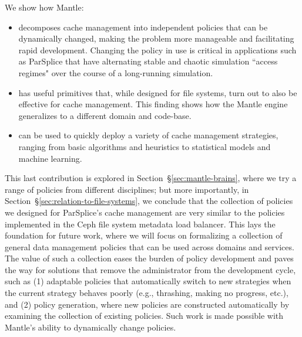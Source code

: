 We show how Mantle:
\begin{itemize}

  \item decomposes cache management into independent policies that can be
  dynamically changed, making the problem more manageable and facilitating rapid
  development. Changing the policy in use is critical in applications such as
  ParSplice that have alternating stable and chaotic simulation ``access regimes"
  over the course of a long-running simulation.  

  \item has useful primitives that, while designed for file systems, turn
  out to also be effective for cache management. This finding shows how the Mantle
  engine generalizes to a different domain and code-base.

  \item can be used to quickly deploy a variety of cache management strategies,
  ranging from basic algorithms and heuristics to statistical models and machine
  learning.

\end{itemize}


This last contribution is explored in Section~\S\ref{sec:mantle-brains}, where
we try a range of policies from different disciplines; but more importantly, in
Section~\S\ref{sec:relation-to-file-systems}, we conclude that the collection
of policies we designed for ParSplice's cache management are very similar to
the policies implemented in the Ceph file system metadata load balancer. This
lays the foundation for future work, where we will focus on formalizing a
collection of general data management policies that can be used across domains
and services. The value of such a collection eases the burden of policy
development and paves the way for solutions that remove the administrator from
the development cycle, such as (1) adaptable policies that automatically switch
to new strategies when the current strategy behaves poorly ({e.g.}, thrashing,
making no progress, etc.), and (2) policy generation, where new policies are
constructed automatically by examining the collection of existing policies.
Such work is made possible with Mantle's ability to dynamically change
policies.


